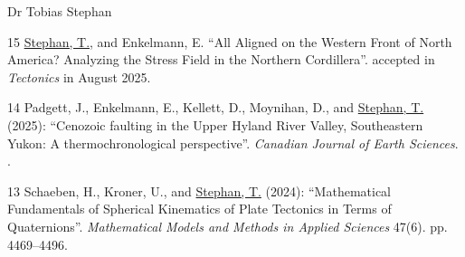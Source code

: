 \documentclass[10pt, paper=letter]{scrartcl} %
\begin{document}
\begin{cv}{\textsf{Dr Tobias Stephan}}
\begin{cvlist}{}
        \item[15] \ul{Stephan, T.}, and Enkelmann, E. \enquote{All Aligned on the Western Front of North America? Analyzing the Stress Field in the Northern Cordillera}. accepted in \textit{Tectonics} in August 2025.

        \item[14] Padgett, J., Enkelmann, E., Kellett, D., Moynihan, D., and \ul{Stephan, T.} (2025): \enquote{Cenozoic faulting in the Upper Hyland River Valley, Southeastern Yukon: A thermochronological perspective}. \textit{Canadian Journal of Earth Sciences}. .
        
        \item[13] Schaeben, H., Kroner, U., and \ul{Stephan, T.} (2024): \enquote{Mathematical Fundamentals of Spherical Kinematics of Plate Tectonics in Terms of Quaternions}. \textit{Mathematical Models and Methods in Applied Sciences} 47(6). pp. 4469--4496. 


\end{cvlist}
\end{cv}
\end{document}
